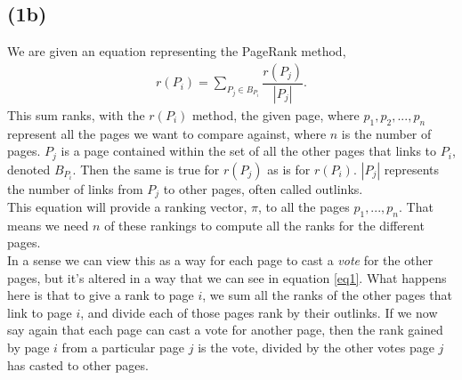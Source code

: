 \documentclass[12pt, letterpaper]{article}
\begin{document}
    \subsection*{(1b)}
      We are given an equation representing the PageRank method,
      \begin{align} \label{eq1}
        r(P_i) = \sum\limits_{P_j \in B_{P_i}} \dfrac{r(P_j)}{|P_j|}.
      \end{align}
      This sum ranks, with the $r(P_i)$ method, the given page, where $p_1, p_2, ... , p_n$ represent all the pages we want to compare against, where $n$ is the number of pages. $P_j$ is a page contained within the set of all the other pages that links to $P_i$, denoted $B_{P_i}$. Then the same is true for $r(P_j)$ as is for $r(P_i)$. $|P_j|$ represents the number of links from $P_j$ to other pages, often called outlinks.\\
      \newline
      This equation will provide a ranking vector, $\pi$, to all the pages $p_1,...,p_n$. That means we need $n$ of these rankings to compute all the ranks for the different pages.\\
      In a sense we can view this as a way for each page to cast a \textit{vote} for the other pages, but it's altered in a way that we can see in equation \ref{eq1}. What happens here is that to give a rank to page $i$, we sum all the ranks of the other pages that link to page $i$, and divide each of those pages rank by their outlinks. If we now say again that each page can cast a vote for another page, then the rank gained by page $i$ from a particular page $j$ is the vote, divided by the other votes page $j$ has casted to other pages.
\end{document}
